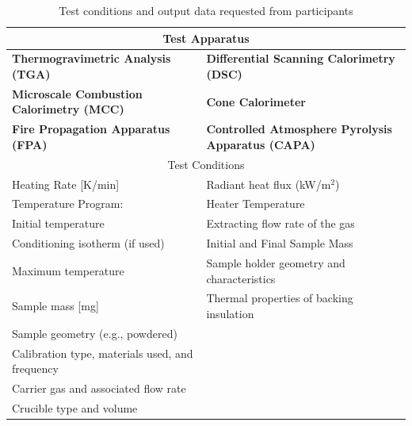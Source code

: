 \documentclass{book}
\begin{document}
\begin{table}[ht]
\caption{Test conditions and output data requested from participants}
\label{Table:Tests_Performed}
\begin{center}
\begin{tabular}{ll}
\hline
\multicolumn{2}{c}{Test Apparatus}                                                                       \\ \hline
 \textbf{Thermogravimetric Analysis (TGA)}         &  \textbf{Differential Scanning Calorimetry (DSC)}              \\
 \textbf{Microscale Combustion Calorimetry (MCC)} &  \textbf{Cone Calorimeter}                                     \\
 \textbf{Fire Propagation Apparatus (FPA)}                  &  \textbf{Controlled Atmosphere Pyrolysis Apparatus (CAPA)}     \\
\hline
\multicolumn{2}{c}{Test Conditions}                                                                      \\ \hline
Heating Rate [K/min]                              & Radiant heat flux (kW/m$^2$)                         \\
Temperature Program:                              & Heater Temperature                                   \\
\hspace{.1in} Initial temperature                 & Extracting flow rate of the gas                      \\
\hspace{.1in} Conditioning isotherm (if used)     & Initial and Final Sample Mass                        \\
\hspace{.1in} Maximum temperature                 & Sample holder geometry and characteristics           \\
Sample mass [mg]                                  & Thermal properties of backing insulation             \\
Sample geometry (e.g., powdered)                  &                                                      \\
Calibration type, materials used, and frequency   &                                                      \\
Carrier gas and associated flow rate              &                                                      \\
Crucible type and volume                          &                                                      \\

\end{tabular}
\end{center}
\end{table}
\end{document}
